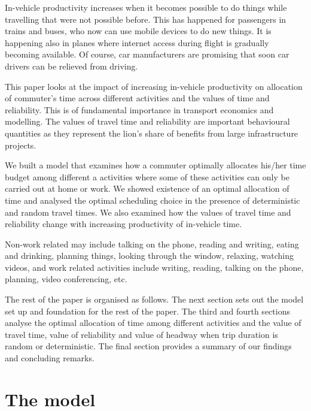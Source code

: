 \documentclass[12pt,a4paper,british]{article}
\begin{document}
In-vehicle productivity increases when it becomes possible to do things while travelling that were not possible before. This has happened for passengers in trains and buses, who now can use mobile devices  to do new things. It is happening also in planes where internet access during flight is gradually becoming available. Of course, car manufacturers are promising that soon car drivers can be relieved from driving.

This paper looks at the impact of increasing in-vehicle productivity on allocation of commuter's time across different activities and the values of time and reliability. This is of fundamental importance in transport economics and modelling. The values of travel time and reliability are important behavioural quantities as they represent the lion's share of benefits from large infrastructure projects.

We built a model that examines how a commuter optimally allocates his/her time budget among different a activities where some of these activities can only be carried out at home or work. We showed existence of an optimal allocation of time and analysed the optimal scheduling choice in the presence of deterministic and random travel times. We also examined how the values of travel time and reliability change with increasing productivity of in-vehicle time.

Non-work related may include talking on the phone, reading and writing, eating and drinking, planning things, looking through the window, relaxing, watching videos, and work related activities include writing, reading, talking on the phone, planning, video conferencing, etc.

The rest of the paper is organised as follows. The next section sets out the model set up and foundation for the rest of the paper. The third and fourth sections analyse the optimal allocation of time among different activities and the value of travel time, value of reliability and value of headway when trip duration is random or deterministic. The final section provides a summary of our findings and concluding remarks.

\section{The model}
\label{sec:model1}
\end{document}
